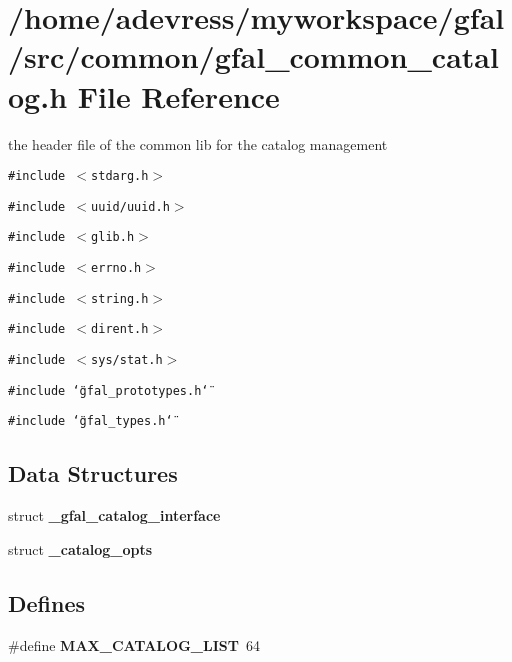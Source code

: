 \section{/home/adevress/myworkspace/gfal/src/common/gfal\_\-common\_\-catalog.h File Reference}
\label{gfal__common__catalog_8h}
the header file of the common lib for the catalog management 

{\tt \#include $<$stdarg.h$>$}\par
{\tt \#include $<$uuid/uuid.h$>$}\par
{\tt \#include $<$glib.h$>$}\par
{\tt \#include $<$errno.h$>$}\par
{\tt \#include $<$string.h$>$}\par
{\tt \#include $<$dirent.h$>$}\par
{\tt \#include $<$sys/stat.h$>$}\par
{\tt \#include \char`\"{}gfal\_\-prototypes.h\char`\"{}}\par
{\tt \#include \char`\"{}gfal\_\-types.h\char`\"{}}\par
\subsection*{Data Structures}
\begin{CompactItemize}
\item 
struct \textbf{\_\-gfal\_\-catalog\_\-interface}
\item 
struct \bf{\_\-catalog\_\-opts}
\end{CompactItemize}
\subsection*{Defines}
\begin{CompactItemize}
\item 
\#define \textbf{MAX\_\-CATALOG\_\-LIST}~64\label{gfal__common__catalog_8h_c39f705683e893b91f559704ee2a707e}

\end{CompactItemize}
